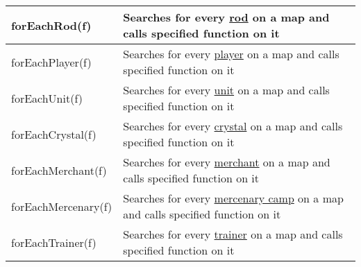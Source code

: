 \begin{center}
\begin{tabularx}{\linewidth}{| l | X |}
\hline
forEachRod(f) & Searches for every \hyperref[Rod]{rod} on a map and calls specified function on it\\
\hline
forEachPlayer(f) & Searches for every \hyperref[Player]{player} on a map and calls specified function on it\\
\hline
forEachUnit(f) & Searches for every \hyperref[Unit]{unit} on a map and calls specified function on it\\
\hline
forEachCrystal(f) & Searches for every \hyperref[Crystal]{crystal} on a map and calls specified function on it\\
\hline
forEachMerchant(f) & Searches for every \hyperref[Merchant]{merchant} on a map and calls specified function on it\\
\hline
forEachMercenary(f) & Searches for every \hyperref[Mercenary]{mercenary camp} on a map and calls specified function on it\\
\hline
forEachTrainer(f) & Searches for every \hyperref[Trainer]{trainer} on a map and calls specified function on it\\
\hline
\end{tabularx}
\end{center}